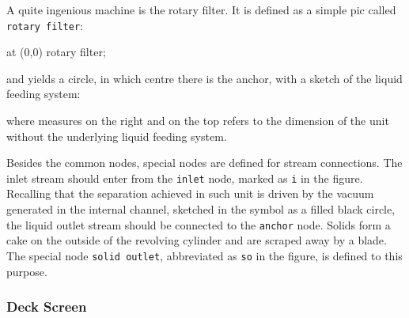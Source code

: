 \documentclass[12pt]{article}						%
\newcommand*{\chpn}[1]{\texttt{#1}}				%
\newcommand*{\chpp}[1]{\texttt{#1}}				%
\begin{document}
A quite ingenious machine is the rotary filter. It is defined as a simple pic
called \chpp{rotary filter}:
\begin{chpcode}
	\pic at (0,0) {rotary filter};
\end{chpcode}
and yields a circle, in which centre there is the anchor, with a sketch of the
liquid feeding system:
\begin{center}
\end{center}
where measures on the right and on the top refers to the dimension of the unit
without the underlying liquid feeding system.

Besides the common nodes, special nodes are defined for stream connections.
The inlet stream should enter from the \chpn{inlet} node, marked as \chpn{i} in
the figure. Recalling that the separation achieved in such unit is driven by the
vacuum generated in the internal channel, sketched in the symbol as a filled
black circle, the liquid outlet stream should be connected to the \chpn{anchor}
node. Solids form a cake on the outside of the revolving cylinder and are
scraped away by a blade. The special node \chpn{solid outlet}, abbreviated as
\chpn{so} in the figure, is defined to this purpose.

\subsubsection{Deck Screen}
\end{document}
